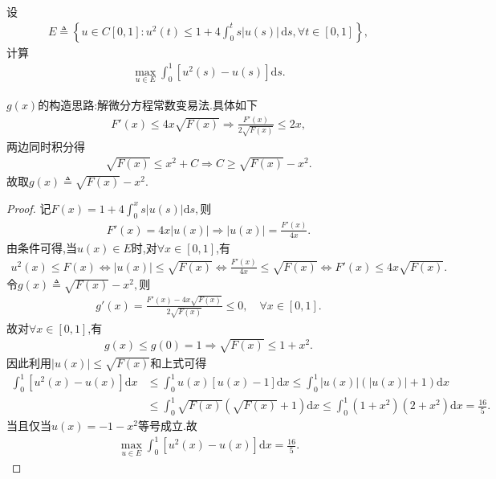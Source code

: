 \documentclass[../../main.tex]{subfiles}
\begin{document}
\begin{example}
设
\begin{align*}
E \triangleq \left\{ u \in C[0,1] : u^2(t) \leqslant 1 + 4 \int_0^t s|u(s)| \, \mathrm{d}s, \forall t \in [0,1] \right\},
\end{align*}
计算
\begin{align*}
\max_{u \in E} \int_0^1 \left[ u^2(s) - u(s) \right] \mathrm{d}s.
\end{align*}
\end{example}
\begin{note}
$g(x)$的构造思路:解微分方程常数变易法.具体如下
\begin{align*}
F'(x) \leqslant 4x\sqrt{F(x)} \Longrightarrow \frac{F'(x)}{2\sqrt{F(x)}} \leqslant 2x,
\end{align*}
两边同时积分得
\begin{align*}
\sqrt{F(x)} \leqslant x^2 + C \Longrightarrow C \geqslant \sqrt{F(x)} - x^2.
\end{align*}
故取$g(x) \triangleq \sqrt{F(x)} - x^2.$
\end{note}
\begin{proof}
记$F(x) = 1 + 4\int_0^x s|u(s)|\mathrm{d}s,$则
\begin{align*}
F'(x) = 4x|u(x)| \Longrightarrow |u(x)| = \frac{F'(x)}{4x}.
\end{align*}
由条件可得,当$u(x) \in E$时,对$\forall x \in [0,1]$,有
\begin{align*}
u^2(x) \leqslant F(x) \Longleftrightarrow |u(x)| \leqslant \sqrt{F(x)} \Longleftrightarrow \frac{F'(x)}{4x} \leqslant \sqrt{F(x)} \Longleftrightarrow F'(x) \leqslant 4x\sqrt{F(x)}.
\end{align*}
令$g(x) \triangleq \sqrt{F(x)} - x^2,$则
\begin{align*}
g'(x) = \frac{F'(x) - 4x\sqrt{F(x)}}{2\sqrt{F(x)}} \leqslant 0, \quad \forall x \in [0,1].
\end{align*}
故对$\forall x \in [0,1]$,有
\begin{align*}
g(x) \leqslant g(0) = 1 \Longrightarrow \sqrt{F(x)} \leqslant 1 + x^2.
\end{align*}
因此利用$|u(x)| \leqslant \sqrt{F(x)}$和上式可得
\begin{align*}
\int_0^1 \left[ u^2(x) - u(x) \right] \mathrm{d}x &\leqslant \int_0^1 u(x) \left[ u(x) - 1 \right] \mathrm{d}x \leqslant \int_0^1 |u(x)| \left( |u(x)| + 1 \right) \mathrm{d}x \\
&\leqslant \int_0^1 \sqrt{F(x)} \left( \sqrt{F(x)} + 1 \right) \mathrm{d}x \leqslant \int_0^1 \left( 1 + x^2 \right) \left( 2 + x^2 \right) \mathrm{d}x = \frac{16}{5}.
\end{align*}
当且仅当$u(x) = -1 - x^2$等号成立.故
\begin{align*}
\max_{u \in E} \int_0^1 \left[ u^2(x) - u(x) \right] \mathrm{d}x = \frac{16}{5}.
\end{align*}

\end{proof}
\end{document}
